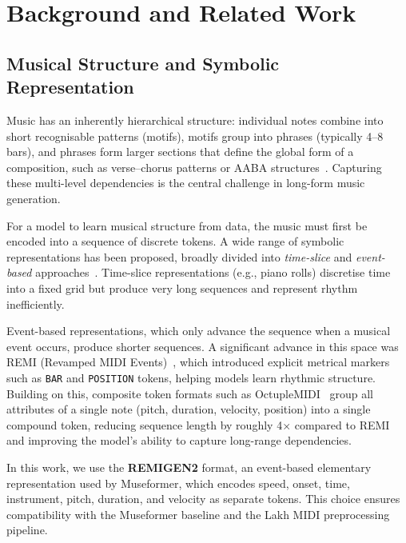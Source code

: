 \documentclass[conference]{IEEEtran}
\begin{document}
\section{Background and Related Work}
\label{sec:background}

\subsection{Musical Structure and Symbolic Representation}
\label{ssec:repr}

Music has an inherently hierarchical structure: individual notes combine into short recognisable patterns (motifs), motifs group into phrases (typically 4--8 bars), and phrases form larger sections that define the global form of a composition, such as verse--chorus patterns or AABA structures~\cite{le2025, ji2023}. Capturing these multi-level dependencies is the central challenge in long-form music generation.

For a model to learn musical structure from data, the music must first be encoded into a sequence of discrete tokens. A wide range of symbolic representations has been proposed, broadly divided into \emph{time-slice} and \emph{event-based} approaches~\cite{le2025}. Time-slice representations (e.g., piano rolls) discretise time into a fixed grid but produce very long sequences and represent rhythm inefficiently.

Event-based representations, which only advance the sequence when a musical event occurs, produce shorter sequences. A significant advance in this space was REMI (Revamped MIDI Events)~\cite{huang2020}, which introduced explicit metrical markers such as \texttt{BAR} and \texttt{POSITION} tokens, helping models learn rhythmic structure. Building on this, composite token formats such as OctupleMIDI~\cite{zeng2021} group all attributes of a single note (pitch, duration, velocity, position) into a single compound token, reducing sequence length by roughly 4$\times$ compared to REMI and improving the model's ability to capture long-range dependencies.

In this work, we use the \textbf{REMIGEN2} format, an event-based
elementary representation used by Museformer, which encodes speed, onset, time, instrument, pitch, duration, and velocity as separate tokens. This choice ensures compatibility with the Museformer baseline and the Lakh MIDI preprocessing pipeline.
\end{document}
